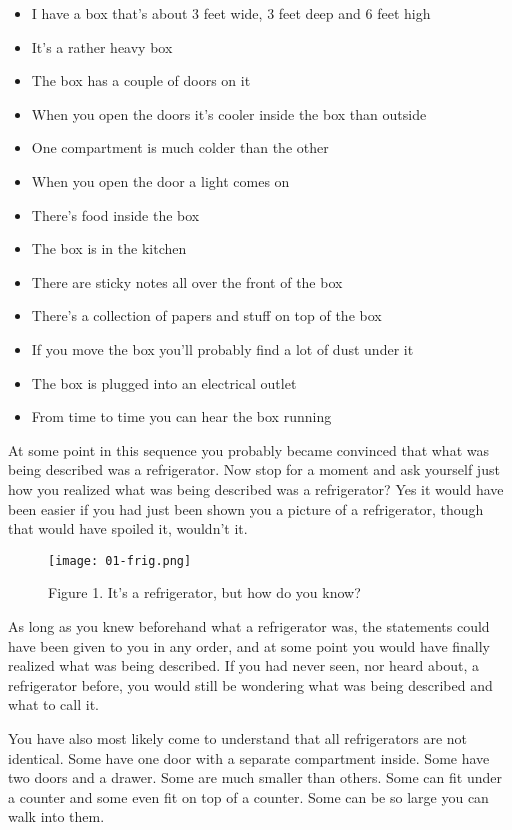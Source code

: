 \documentclass[]{memoir}
\let\Oldincludegraphics\includegraphics
\renewcommand{\includegraphics}[1]{\Oldincludegraphics[max size={\textwidth}{\textheight}]{#1}}
\begin{document}
\begin{itemize}
\itemsep1pt\parskip0pt
\item
  I have a box that's about 3 feet wide, 3 feet deep and 6 feet high
\item
  It's a rather heavy box
\item
  The box has a couple of doors on it
\item
  When you open the doors it's cooler inside the box than outside
\item
  One compartment is much colder than the other
\item
  When you open the door a light comes on
\item
  There's food inside the box
\item
  The box is in the kitchen
\item
  There are sticky notes all over the front of the box
\item
  There's a collection of papers and stuff on top of the box
\item
  If you move the box you'll probably find a lot of dust under it
\item
  The box is plugged into an electrical outlet
\item
  From time to time you can hear the box running
\end{itemize}

At some point in this sequence you probably became convinced that what
was being described was a refrigerator. Now stop for a moment and ask
yourself just how you realized what was being described was a
refrigerator? Yes it would have been easier if you had just been shown
you a picture of a refrigerator, though that would have spoiled it,
wouldn't it.

\begin{figure}[htbp]
\centering
\texttt{[image: 01-frig.png]}
\caption{Figure 1. It's a refrigerator, but how do you know?}
\end{figure}

As long as you knew beforehand what a refrigerator was, the statements
could have been given to you in any order, and at some point you would
have finally realized what was being described. If you had never seen,
nor heard about, a refrigerator before, you would still be wondering
what was being described and what to call it.

You have also most likely come to understand that all refrigerators are
not identical. Some have one door with a separate compartment inside.
Some have two doors and a drawer. Some are much smaller than others.
Some can fit under a counter and some even fit on top of a counter. Some
can be so large you can walk into them.
\end{document}
